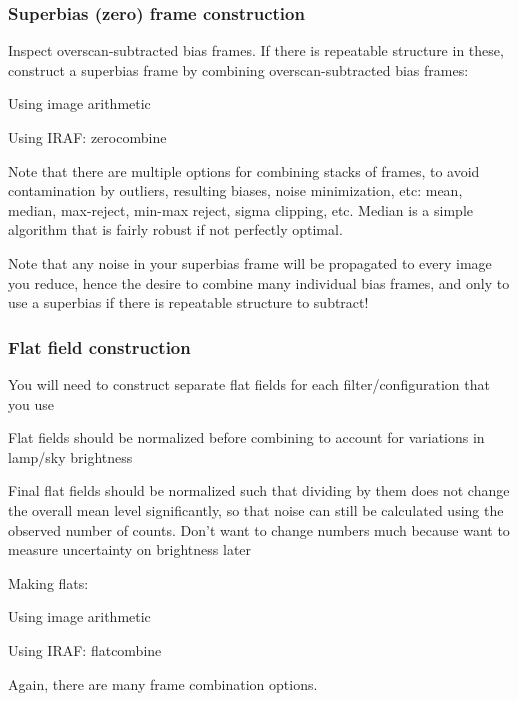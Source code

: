 \documentclass{article}
\begin{document}
\subsubsection*{Superbias (zero) frame construction}
\begin{itemize*}
    \item Inspect overscan-subtracted bias frames. If there is repeatable
        structure in these, construct a superbias frame by combining
        overscan-subtracted bias frames:
        \begin{itemize*}
            \item Using image arithmetic
            \item Using IRAF: zerocombine
            \item Note that there are multiple options for combining stacks of frames,
                to avoid contamination by outliers, resulting biases, noise
                minimization, etc: mean, median, max-reject, min-max reject, sigma
                clipping, etc. Median is a simple algorithm that is fairly robust if
                not perfectly optimal.
        \end{itemize*}
    \item Note that any noise in your superbias frame will be propagated to
        every image you reduce, hence the desire to combine many individual
        bias frames, and only to use a superbias if there is repeatable
        structure to subtract!
\end{itemize*}
\subsubsection*{Flat field construction}
\begin{itemize*}
    \item You will need to construct separate flat fields for each
        filter/configuration that you use
    \item Flat fields should be normalized before combining to account for
        variations in lamp/sky brightness
    \item Final flat fields should be normalized such that dividing by them does
        not change the overall mean level significantly, so that noise can
        still be calculated using the observed number of
        counts. Don't want to change numbers much because want
        to measure uncertainty on brightness later
    \item Making flats:
        \begin{itemize*}
            \item Using image arithmetic
            \item Using IRAF: flatcombine
            \item Again, there are many frame combination options.
        \end{itemize*}
\end{itemize*}
\end{document}

